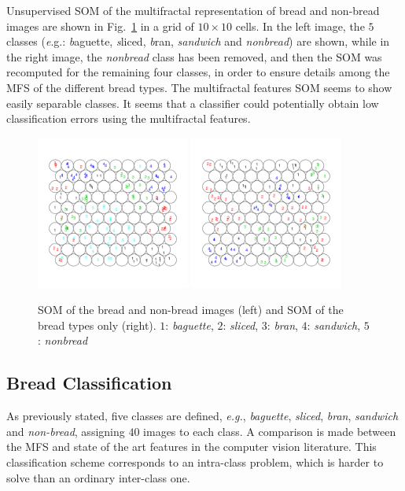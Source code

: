 \documentclass[a4paper,10pt]{article}
\begin{document}
Unsupervised SOM of the multifractal representation of bread and non-bread images are shown in Fig.~\ref{fig:somfractal} in a grid of $10\times10$ cells. In the left image, the $5$ classes ({\emph e.g.}: {\emph baguette}, {\emph sliced}, {\emph bran}, {\em sandwich} and {\em nonbread}) are shown, while in the right image, the {\em nonbread} class has been removed, and then the SOM was recomputed for the remaining four classes, in order to ensure details among the MFS of the different bread types. The multifractal features SOM seems to show easily separable classes. It seems that a classifier could potentially obtain low classification errors using the multifractal features.
\begin{figure}
\begin{centering}
\includegraphics[width=0.45\textwidth]{images/sommultifractal}
\includegraphics[width=0.45\textwidth]{images/sombreadmultifractal}
\caption{SOM of the bread and non-bread images (left) and SOM of the bread types only (right). $1$: {\em baguette}, $2$: {\em sliced}, $3$: {\em bran}, $4$: {\em sandwich}, $5$: {\em nonbread} }
\label{fig:somfractal}
\end{centering}
\end{figure}

\subsection{Bread Classification}
\label{sec:10}
As previously stated, five classes are defined, {\em e.g.}, {\em baguette}, {\em sliced}, {\em bran}, {\em sandwich} and {\em non-bread}, assigning $40$ images to each class. A comparison is made between the MFS and state of the art features in the computer vision literature. This classification scheme corresponds to an intra-class problem, which is harder to solve than an ordinary inter-class one. 
\end{document}
